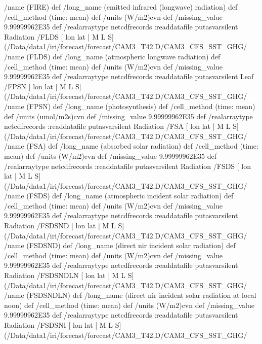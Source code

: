 \begin{ingrid}
{/name (FIRE) def
 /long_name (emitted infrared (longwave) radiation) def
 /cell_method (time: mean) def
 /units (W/m2)cvn def
 /missing_value 9.99999962E35 def
 /realarraytype netcdfrecords :readdatafile
}putasvarsilent
Radiation /FLDS{
[ lon lat | M L S] (/Data/data1/iri/forecast/forecast/CAM3_T42.D/CAM3_CFS_SST_GHG/%
/name (FLDS) def
 /long_name (atmospheric longwave radiation) def
 /cell_method (time: mean) def
 /units (W/m2)cvn def
 /missing_value 9.99999962E35 def
 /realarraytype netcdfrecords :readdatafile
}putasvarsilent
Leaf /FPSN{
[ lon lat | M L S] (/Data/data1/iri/forecast/forecast/CAM3_T42.D/CAM3_CFS_SST_GHG/%
/name (FPSN) def
 /long_name (photosynthesis) def
 /cell_method (time: mean) def
 /units (umol/m2s)cvn def
 /missing_value 9.99999962E35 def
 /realarraytype netcdfrecords :readdatafile
}putasvarsilent
Radiation /FSA{
[ lon lat | M L S] (/Data/data1/iri/forecast/forecast/CAM3_T42.D/CAM3_CFS_SST_GHG/%
/name (FSA) def
 /long_name (absorbed solar radiation) def
 /cell_method (time: mean) def
 /units (W/m2)cvn def
 /missing_value 9.99999962E35 def
 /realarraytype netcdfrecords :readdatafile
}putasvarsilent
Radiation /FSDS{
[ lon lat | M L S] (/Data/data1/iri/forecast/forecast/CAM3_T42.D/CAM3_CFS_SST_GHG/%
/name (FSDS) def
 /long_name (atmospheric incident solar radiation) def
 /cell_method (time: mean) def
 /units (W/m2)cvn def
 /missing_value 9.99999962E35 def
 /realarraytype netcdfrecords :readdatafile
}putasvarsilent
Radiation /FSDSND{
[ lon lat | M L S] (/Data/data1/iri/forecast/forecast/CAM3_T42.D/CAM3_CFS_SST_GHG/%
/name (FSDSND) def
 /long_name (direct nir incident solar radiation) def
 /cell_method (time: mean) def
 /units (W/m2)cvn def
 /missing_value 9.99999962E35 def
 /realarraytype netcdfrecords :readdatafile
}putasvarsilent
Radiation /FSDSNDLN{
[ lon lat | M L S] (/Data/data1/iri/forecast/forecast/CAM3_T42.D/CAM3_CFS_SST_GHG/%
/name (FSDSNDLN) def
 /long_name (direct nir incident solar radiation at local noon) def
 /cell_method (time: mean) def
 /units (W/m2)cvn def
 /missing_value 9.99999962E35 def
 /realarraytype netcdfrecords :readdatafile
}putasvarsilent
Radiation /FSDSNI{
[ lon lat | M L S] (/Data/data1/iri/forecast/forecast/CAM3_T42.D/CAM3_CFS_SST_GHG/%
}
\end{ingrid}
